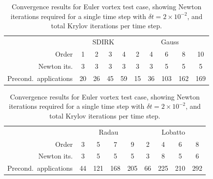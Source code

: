 \documentclass[review]{siamart}
\begin{document}
\begin{table}
	\centering
	\caption{Convergence results for Euler vortex test case, showing Newton iterations required for a single time step with $\delta t = 2\times10^{-2}$, and total Krylov iterations per time step.}
	\label{tab:ev-solvers}
	\begin{tabular}{r|cccc|ccccc}
		\toprule
		& \multicolumn{4}{c}{SDIRK} & \multicolumn{5}{c}{Gauss} \\
		Order  & 1 & 2 & 3 & 4 & 2 & 4 & 6 & 8 & 10\\
		\midrule
		Newton its. & 3 & 3 & 3 & 3 & 3 & 3 & 5 & 5 & 5\\
		\midrule
		Precond.\ applications & 20 & 26 & 45 & 59 & 15 & 36 & 103 & 162 & 169\\
		\bottomrule
	\end{tabular}

	\vspace{\floatsep}

	\begin{tabular}{r|cccc|cccc}
		\toprule
		& \multicolumn{4}{c}{Radau} & \multicolumn{4}{c}{Lobatto} \\
		Order  & 3 & 5 & 7 & 9 & 2 & 4 & 6 & 8\\
		\midrule
		Newton its. & 3 & 5 & 5 & 5 & 3 & 8 & 5 & 6\\
		\midrule
		Precond.\ applications & 44 & 121 & 168 & 205 & 66 & 225 & 210 & 292\\
		\bottomrule
	\end{tabular}
\end{table}
\end{document}
